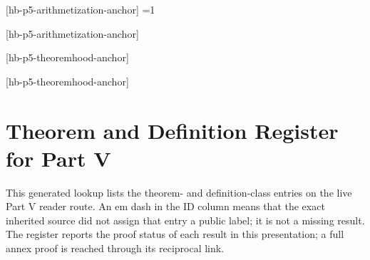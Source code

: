 






\setcounter{hbsourcep5theorem}{0}
[hb-p5-arithmetization-anchor]{%
  \ifnum\value{hbsourcep5theorem}=1
    \label{thm:arithmetization-syntax}%
  \fi}

[hb-p5-arithmetization-anchor]











[hb-p5-theoremhood-anchor]{%
  \label{thm:theoremhood-undecidable}}

[hb-p5-theoremhood-anchor]











\section*{Theorem and Definition Register for Part V}
\label{sec:p05-theorem-definition-register}

This generated lookup lists the theorem- and definition-class entries on the
live Part V reader route.  An em dash in the ID column means that the exact
inherited source did not assign that entry a public label; it is not a missing
result.  The register reports the proof status of each result in this
presentation; a full annex proof is reached through its reciprocal link.

